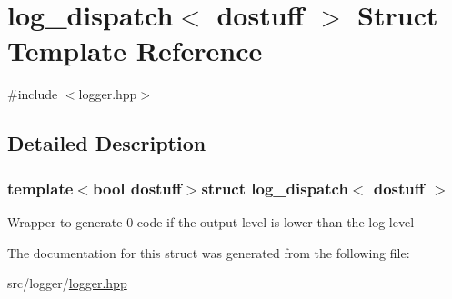\hypertarget{structlog__dispatch}{\section{log\-\_\-dispatch$<$ dostuff $>$ Struct Template Reference}
\label{structlog__dispatch}
}


{\ttfamily \#include $<$logger.\-hpp$>$}



\subsection{Detailed Description}
\subsubsection*{template$<$bool dostuff$>$struct log\-\_\-dispatch$<$ dostuff $>$}

Wrapper to generate 0 code if the output level is lower than the log level 

The documentation for this struct was generated from the following file\-:\begin{DoxyCompactItemize}
\item 
src/logger/\hyperlink{logger_8hpp}{logger.\-hpp}\end{DoxyCompactItemize}
